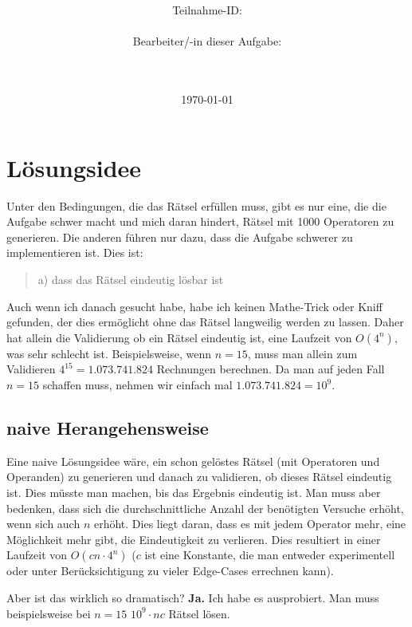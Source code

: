 \documentclass[a4paper,10pt,ngerman]{scrartcl}
\title{\textbf{\Huge\Aufgabe}}
\author{\LARGE Teilnahme-ID: \LARGE \TeilnahmeId \\\\
	    \LARGE Bearbeiter/-in dieser Aufgabe: \\ 
	    \LARGE \Name\\\\}
\date{\LARGE\today}
\begin{document}
\maketitle

\setcounter{tocdepth}{3}
\tableofcontents

\vspace{0.5cm}

\section{Lösungsidee}

Unter den Bedingungen, die das Rätsel erfüllen muss, gibt es nur eine, die die Aufgabe schwer macht und mich daran hindert, Rätsel mit 1000 Operatoren zu generieren. Die anderen führen nur dazu, dass die Aufgabe schwerer zu implementieren ist. Dies ist:
\begin{quote}
a) dass das Rätsel eindeutig lösbar ist
\end{quote}

Auch wenn ich danach gesucht habe, habe ich keinen Mathe-Trick oder Kniff gefunden, der dies ermöglicht ohne das Rätsel langweilig werden zu lassen. Daher hat allein die Validierung ob ein Rätsel eindeutig ist, eine Laufzeit von $O(4^n)$, was sehr schlecht ist. Beispielsweise, wenn $n=15$, muss man allein zum Validieren $4^15=1.073.741.824$ Rechnungen berechnen. Da man auf jeden Fall $n=15$ schaffen muss, nehmen wir einfach mal $1.073.741.824=10^9$.

\subsection{naive Herangehensweise}

Eine naive Lösungsidee wäre, ein schon gelöstes Rätsel (mit Operatoren und Operanden) zu generieren und danach zu validieren, ob dieses Rätsel eindeutig ist. Dies müsste man machen, bis das Ergebnis eindeutig ist. Man muss aber bedenken, dass sich die durchschnittliche Anzahl der benötigten Versuche erhöht, wenn sich auch $n$ erhöht. Dies liegt daran, dass es mit jedem Operator mehr, eine Möglichkeit mehr gibt, die Eindeutigkeit zu verlieren. Dies resultiert in einer Laufzeit von $O(cn \cdot 4^n)$ ($c$ ist eine Konstante, die man entweder experimentell oder unter Berücksichtigung zu vieler Edge-Cases errechnen kann).

Aber ist das wirklich so dramatisch? \textbf{Ja.} Ich habe es ausprobiert. Man muss beispielsweise bei $n=15$ $10^9 \cdot nc$ Rätsel lösen.
\end{document}
